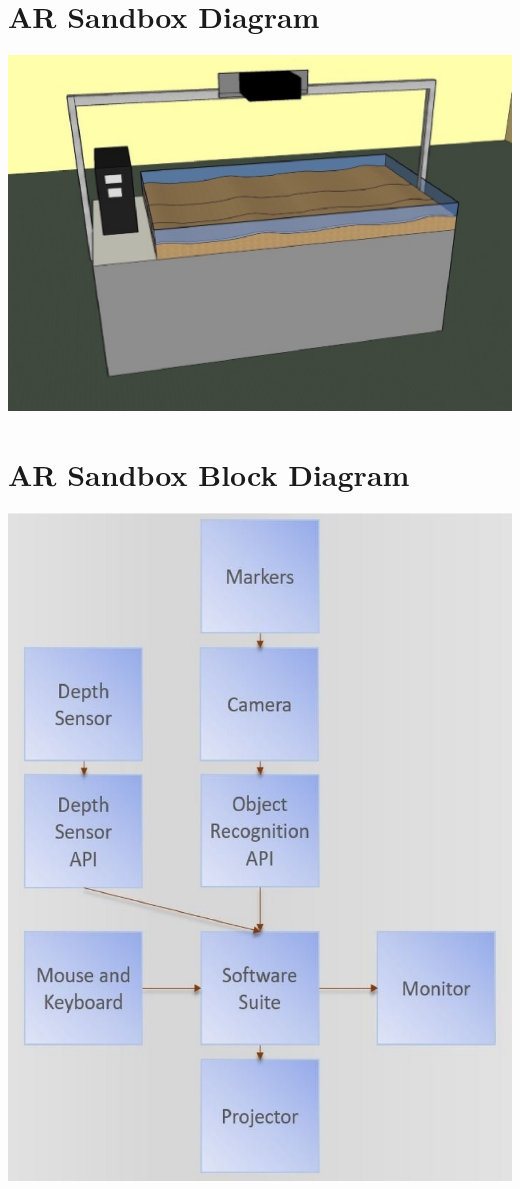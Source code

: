\documentclass[letterpaper, 10pt, onecolumn, draftclsnofoot]{IEEEtran}
\begin{document}
\newpage
\appendices
    \section{AR Sandbox Diagram}
        \includegraphics{ARSandbox.eps}
    \section{AR Sandbox Block Diagram}
        \includegraphics{BlockDiagram.eps}
\end{document}
